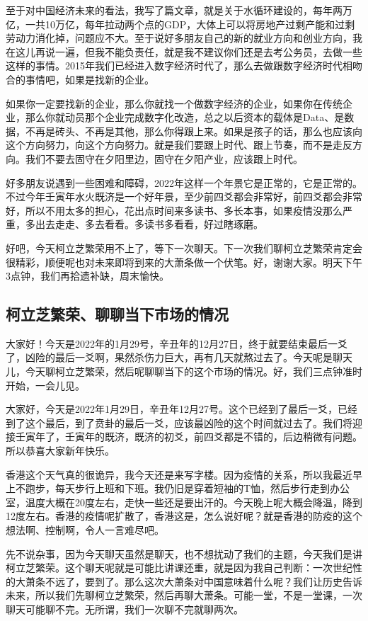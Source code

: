 \documentclass[UTF8, 12pt, a4paper]{ctexrep}
\begin{document}
至于对中国经济未来的看法，我写了篇文章，就是关于水循环建设的，每年两万亿，一共10万亿，每年拉动两个点的GDP，大体上可以将房地产过剩产能和过剩劳动力消化掉，问题应不大。至于说好多朋友自己的新的就业方向和创业方向，我在这儿再说一遍，但我不能负责任，就是我不建议你们还是去考公务员，去做一些这样的事情。2015年我们已经进入数字经济时代了，那么去做跟数字经济时代相吻合的事情吧，如果是找新的企业。

如果你一定要找新的企业，那么你就找一个做数字经济的企业，如果你在传统企业，那么你就动员那个企业完成数字化改造，总之以后资本的载体是Data、是数据，不再是砖头、不再是其他，那么你得跟上来。如果是孩子的话，那么也应该向这个方向努力，向这个方向努力。就是我们要跟上时代、跟上节奏，而不是走反方向。我们不要去固守在夕阳里边，固守在夕阳产业，应该跟上时代。

好多朋友说遇到一些困难和障碍，2022年这样一个年景它是正常的，它是正常的。不过今年壬寅年水火既济是一个好年景，至少前四爻都会非常好，前四爻都会非常好，所以不用太多的担心，花出点时间来多读书、多长本事，如果疫情没那么严重，多出去走走、多去看看。多读书多看看，好过瞎琢磨。

好吧，今天柯立芝繁荣用不上了，等下一次聊天。下一次我们聊柯立芝繁荣肯定会很精彩，顺便呢也对未来即将到来的大萧条做一个伏笔。好，谢谢大家。明天下午3点钟，我们再拾遗补缺，周末愉快。

\subsection{柯立芝繁荣、聊聊当下市场的情况}

大家好！今天是2022年的1月29号，辛丑年的12月27日，终于就要结束最后一爻了，凶险的最后一爻啊，果然杀伤力巨大，再有几天就熬过去了。今天呢是聊天儿，今天聊柯立芝繁荣，然后呢聊聊当下的这个市场的情况。好，我们三点钟准时开始，一会儿见。

大家好，今天是2022年1月29日，辛丑年12月27号。这个已经到了最后一爻，已经到了这个最后，到了贲卦的最后一爻，应该最凶险的这个时间就过去了。我们将迎接壬寅年了，壬寅年的既济，既济的初爻，前四爻都是不错的，后边稍微有问题。所以恭喜大家新年快乐。

香港这个天气真的很诡异，我今天还是来写字楼。因为疫情的关系，所以我最近早上不跑步，每天步行上班和下班。我仍旧是穿着短袖的T恤，然后步行走到办公室，温度大概在20度左右，走快一些还是要出汗的。今天晚上呢大概会降温，降到12度左右。香港的疫情呢扩散了，香港这是，怎么说好呢？就是香港的防疫的这个想法啊、控制啊，令人一言难尽吧。

先不说杂事，因为今天聊天虽然是聊天，也不想扰动了我们的主题，今天我们是讲柯立芝繁荣。这个聊天呢就是可能比讲课还重，就是因为我自己判断：一次世纪性的大萧条不远了，要到了。那么这次大萧条对中国意味着什么呢？我们让历史告诉未来，所以我们先聊柯立芝繁荣，然后再聊大萧条。可能一堂，不是一堂课，一次聊天可能聊不完。无所谓，我们一次聊不完就聊两次。
\end{document}
